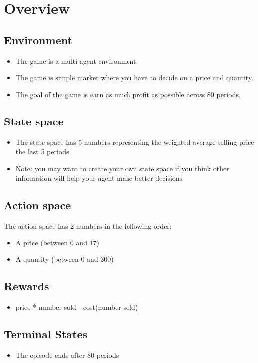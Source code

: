 \documentclass[11pt]{article}
\author{Kevin James}
\date{\today}
\title{}
\begin{document}
\section{Overview}
\label{sec:org78abbba}
\subsection{Environment}
\label{sec:org062ff90}
\begin{itemize}
\item The game is a multi-agent environment.
\item The game is simple market where you have to decide on a price and quantity.
\item The goal of the game is earn as much profit as possible across 80 periods.
\end{itemize}
\subsection{State space}
\label{sec:org4e4bf58}
\begin{itemize}
\item The state space has 5 numbers representing the weighted average selling price the last 5 periods
\item Note: you may want to create your own state space if you think other information will help your agent make better decisions
\end{itemize}
\subsection{Action space}
\label{sec:orgb8fb324}
The action space has 2 numbers in the following order:
\begin{itemize}
\item A price (between 0 and 17)
\item A quantity (between 0 and 300)
\end{itemize}
\subsection{Rewards}
\label{sec:orgdb270bc}
\begin{itemize}
\item price * number sold - cost(number sold)
\end{itemize}
\subsection{Terminal States}
\label{sec:org121919a}
\begin{itemize}
\item The episode ends after 80 periods
\end{itemize}
\end{document}
